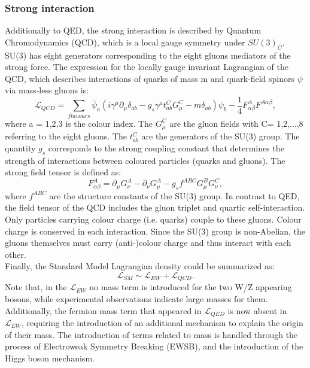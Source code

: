 \subsubsection{Strong interaction}
Additionally to QED, the strong interaction is described by Quantum Chromodynamics (QCD), which is a local gauge symmetry under $SU(3)_C$. SU(3) has eight generators corresponding to the eight gluons mediators of the strong force. The expression for the locally gauge invariant Lagrangian of the QCD, which describes interactions of quarks of mass m and quark-field spinors $\psi$ via mass-less gluons is:
\begin{equation}
    \mathcal{L}_{QCD} = \sum_{flavours} \bar{\psi}_a(i\gamma^\mu\partial_\mu\delta_{ab}-g_{s}\gamma^\mu t^C_{ab}G^C_\mu - m\delta_{ab})\psi_b - \frac{1}{4}F^A_{\alpha\beta}F^{A\alpha\beta},
\end{equation}
where a = 1,2,3 is the colour index. The $G^{C}_\mu$ are the gluon fields with C= 1,2,...,8 referring to the eight gluons. The $t^C_{ab}$ are the generators of the SU(3) group. The quantity $g_{s}$ corresponds to the strong coupling constant that determines the strength of interactions between coloured particles (quarks and gluons). The strong field tensor is defined as:
\begin{equation}
    F^A_{\alpha\beta} = \partial_\mu G^A_\nu - \partial_\nu G^A_\mu - g_sf^{ABC}G^B_\mu G^C_\nu,
\end{equation}
where $f^{ABC}$ are the structure constants of the SU(3) group. In contrast to QED, the field tensor of the QCD includes the gluon triplet and quartic self-interaction. Only particles carrying colour charge (i.e. quarks) couple to these gluons. Colour charge is conserved in each interaction. Since the SU(3) group is non-Abelian, the gluons themselves must carry (anti-)colour charge and thus interact with each other. \\
Finally, the Standard Model Lagrangian density could be summarized as: 
\begin{equation}
    \mathcal{L}_{SM} \sim \mathcal{L}_{EW} + \mathcal{L}_{QCD}.
\end{equation}
Note that, in the $\mathcal{L}_{EW}$ no mass term is introduced for the two W/Z appearing bosons, while experimental observations indicate large masses for them. Additionally, the fermion mass term that appeared in $\mathcal{L}_{QED}$ is now absent in $\mathcal{L}_{EW}$, requiring the introduction of an additional mechanism to explain the origin of their mass. The introduction of terms related to mass is handled through the process of Electroweak Symmetry Breaking (EWSB), and the introduction of the Higgs boson mechanism.

